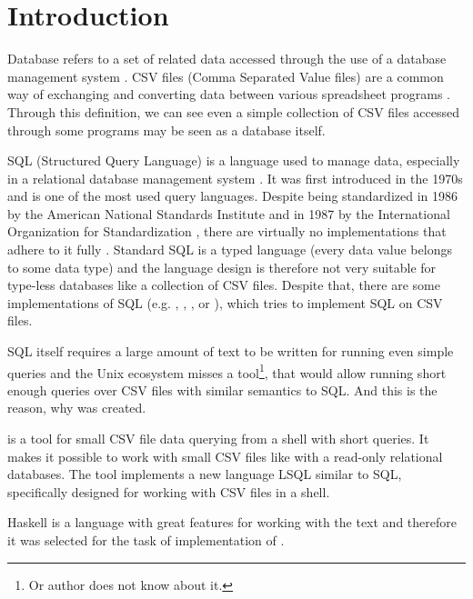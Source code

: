 \chapter*{Introduction}

Database refers to a set of related data accessed through the use of a database management system \cite{enwiki-database}.
CSV files (Comma Separated Value files) are a common way of exchanging and converting data between various spreadsheet programs \cite{rfc4180}.
Through this definition, we can see even a simple collection of CSV files accessed through some programs may be seen as a database itself.


SQL (Structured Query Language) is a language used to manage data, especially in a relational database management system \cite{enwiki-sql}.
It was first introduced in the 1970s \cite{enwiki-sql} and is one of the most used query languages. 
Despite being standardized in 1986 by the American National Standards Institute \cite{ANSI-X3.135-1986} and
in 1987 by the International Organization for Standardization \cite{ISO9075-1987}, 
there are virtually no implementations that adhere to it fully \cite{enwiki-sql}.
Standard SQL is a typed language (every data value belongs to some data type) \cite{ISO9075-2023} and the language
design is therefore not very suitable for type-less databases like a collection of CSV files.
Despite that, there are some implementations of SQL (e.g.  \cite{q},  \cite{csv-sql},  \cite{trdsql}, or  \cite{csvq}), which tries to implement SQL on CSV files.

SQL itself requires a large amount of text to be written for running even simple queries and the Unix ecosystem misses a tool\footnote{Or author does not know about it.}, 
that would allow running short enough queries over CSV files with similar semantics to SQL. And this is the reason, why  was created.

 is a tool for small CSV file data querying from a shell with short queries. It makes it possible to work with small CSV files like with a read-only relational databases.
The tool implements a new language LSQL similar to SQL, specifically designed for working with CSV files in a shell.

Haskell is a language with great features for working with the text \cite{practical-haskell} and therefore it was selected for the task of implementation of .
